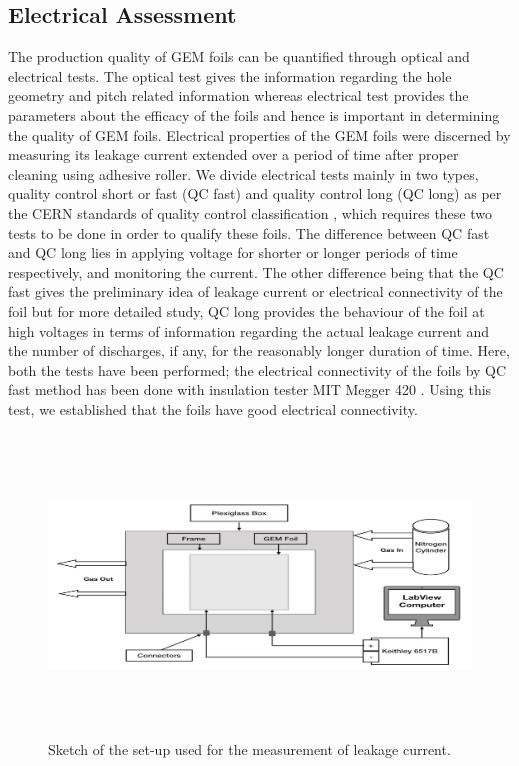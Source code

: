 \subsection{Electrical Assessment}
The production quality of GEM foils can be quantified through optical and electrical tests. The optical test gives the information regarding the hole geometry and pitch related information whereas electrical test provides the parameters about the efficacy of the foils and hence is important in determining the quality of GEM foils. Electrical properties of the GEM foils were discerned by measuring its leakage current extended over a period of time after proper cleaning using adhesive roller. We divide electrical tests mainly in two types, quality control short or fast (QC fast) and quality control long (QC long) as per the CERN standards of quality control classification \cite{eleven}, which requires these two tests to be done in order to qualify these foils. The difference between QC fast and QC long lies in applying voltage for shorter or longer periods of time respectively, and monitoring the current. The other difference being that the QC fast gives the preliminary idea of leakage current or electrical connectivity of the foil but for more detailed study, QC long provides the behaviour of the foil at high voltages in terms of information regarding the actual leakage current and the number of discharges, if any, for the reasonably longer duration of time. Here, both the tests have been performed; the electrical connectivity of the foils by QC fast method has been done with insulation tester MIT Megger 420 \cite{twelve}. Using this test, we established that the foils have good electrical connectivity.
\begin{figure}[!htbp]
    \centering
        \includegraphics[width=12cm,height=8cm]{figures/GEM/figures/10.jpeg}
   \caption{Sketch of the set-up used for the measurement of leakage current.} \label{fig:Cleaning_Measurement}
\end{figure}
